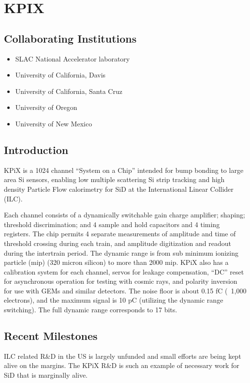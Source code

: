 \section{KPIX}
\subsection{Collaborating Institutions}
\begin{itemize}
	\item SLAC National Accelerator laboratory
	\item University of California, Davis
	\item University of California, Santa Cruz
	\item University of Oregon
	\item University of New Mexico
\end{itemize}
\subsection{Introduction}
KPiX is a 1024 channel ``System on a Chip'' intended for bump bonding to large area Si sensors, enabling low multiple scattering Si strip tracking and high density Particle Flow calorimetry for SiD at the International Linear Collider (ILC).

Each channel consists of a dynamically switchable gain charge amplifier; shaping; threshold discrimination; and 4 sample and hold capacitors and 4 timing registers. The chip permits 4 separate measurements of amplitude and time of threshold crossing during each train, and amplitude digitization and readout during the intertrain period. The dynamic range is from sub minimum ionizing particle (mip) (320 micron silicon) to more than 2000 mip. KPiX also has a calibration system for each channel, servos for leakage compensation, ``DC'' reset for asynchronous operation for testing with cosmic rays, and polarity inversion for use with GEMs and similar detectors. The noise floor is about 0.15 fC (~1,000 electrons), and the maximum signal is 10 pC (utilizing the dynamic range switching). The full dynamic range corresponds to 17 bits. 

\subsection{Recent Milestones}
ILC related R\&D in the US is largely unfunded and small efforts are being kept alive on the margins. The KPiX R\&D is such an example of necessary work for SiD that is marginally alive.
